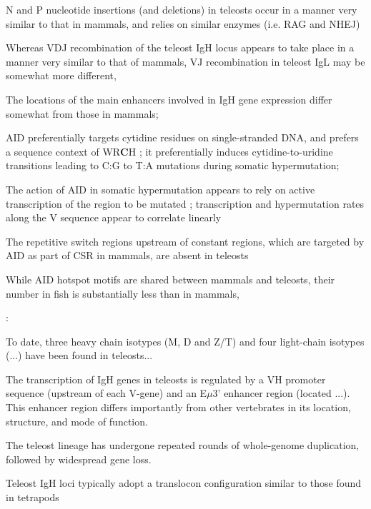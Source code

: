 N and P nucleotide insertions (and deletions) in teleosts occur in a manner very similar to that in mammals, and relies on similar enzymes (i.e. RAG and NHEJ)

Whereas VDJ recombination of the teleost IgH locus appears to take place in a manner very similar to that of mammals, VJ recombination in teleost IgL may be somewhat more different, %

The locations of the main enhancers involved in IgH gene expression differ somewhat from those in mammals; %

AID preferentially targets cytidine residues on single-stranded DNA, and prefers a sequence context of WR\textbf{C}H %
; it preferentially induces cytidine-to-uridine transitions leading to C:G to T:A mutations during somatic hypermutation; %

The action of AID in somatic hypermutation appears to rely on active transcription of the region to be mutated%
; transcription and hypermutation rates along the V sequence appear to correlate linearly %

The repetitive switch regions upstream of constant regions, which are targeted by AID as part of CSR in mammals, are absent in teleosts %

While AID hotspot motifs are shared between mammals and teleosts, their number in fish is substantially less than in mammals, %

\citep{hikima2011ig}:

To date, three heavy chain isotypes (M, D and Z/T) and four light-chain isotypes (...) have been found in teleosts...

The transcription of IgH genes in teleosts is regulated by a VH promoter sequence (upstream of each V-gene) and an E$\mu$3' enhancer region (located ...). This enhancer region differs importantly from other vertebrates in its location, structure, and mode of function.

The teleost lineage has undergone repeated rounds of whole-genome duplication, followed by widespread gene loss.

Teleost IgH loci typically adopt a translocon configuration similar to those found in tetrapods%


